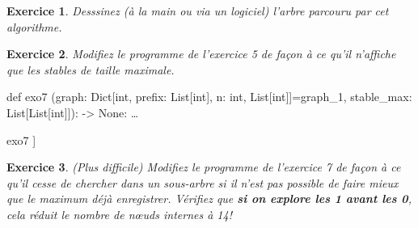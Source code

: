 \documentclass[11pt]{article}
\newtheorem{exercice}{Exercice}
\newenvironment{signature}[1]{\begin{framed} \ttfamily def #1}{ \ldots \end{framed}}
\newenvironment{is_output}[1]{\begin{framed} \ttfamily python /\ldots /#1.py\\}{\end{framed}}
\begin{document}
\begin{exercice}
Desssinez (à la main ou via un logiciel) l'arbre parcouru par cet algorithme.
\end{exercice}

\begin{exercice}
Modifiez le programme de l'exercice 5 de façon à ce qu'il n'affiche que les stables de taille maximale.
\end{exercice}

\begin{signature}{exo7}
(graph: Dict[int, prefix: List[int], n: int, List[int]]=graph\_1, stable\_max: List[List[int]]): -> None:
\end{signature}

\begin{is_output}{exo7}
\quad [[1, 0, 1, 0, 1, 0]]
\end{is_output}

\begin{exercice}(Plus difficile)
Modifiez le programme de l'exercice 7 de façon à ce qu'il cesse de chercher dans un sous-arbre si il n'est pas possible de faire mieux que le maximum déjà enregistrer. Vérifiez que \textbf{si on explore les 1 \textbf{avant} les 0}, cela réduit le nombre de n{\oe}uds internes à 14!
\end{exercice}
\end{document}
